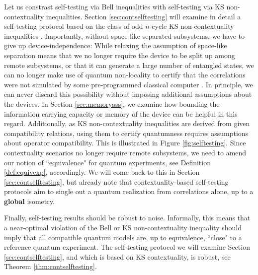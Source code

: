 Let us constrast self-testing via Bell inequalities with self-testing via KS non-contextuality inequalities. Section \ref{sec:contselftesting} will examine in detail a self-testing protocol based on the class of odd $n$-cycle KS non-contextuality inequalities \cite{Bharti2019}. Importantly, without space-like separated subsystems, we have to give up device-independence: While relaxing the assumption of space-like separation means that we no longer require the device to be split up among remote subsystems, or that it can generate a large number of entangled states, we can no longer make use of quantum non-locality to certify that the correlations were not simulated by some pre-programmed classical computer \cite{Supic2020}. In principle, we can never discard this possibility without imposing additional assumptions about the devices. In Section \ref{sec:memoryass}, we examine how bounding the information carrying capacity or memory of the device can be helpful in this regard. Additionally, as KS non-contextuality inequalities are derived from given compatibility relations, using them to certify quantumness requires assumptions about operator compatibility. This is illustrated in Figure \ref{fig:selftesting}. Since contextuality scenarios no longer require remote subsystems, we need to amend our notion of ``equivalence" for quantum experiments, see Definition \ref{def:equivexp}, accordingly. We will come back to this in Section \ref{sec:contselftesting}, but already note that contextuality-based self-testing protocols aim to single out a quantum realization from correlations alone, up to a \textbf{global} isometry.

Finally, self-testing results should be robust to noise. Informally, this means that a near-optimal violation of the Bell or KS non-contextuality inequality should imply that all compatible quantum models are, up to equivalence, ``close" to a reference quantum experiment. The self-testing protocol we will examine Section \ref{sec:contselftesting}, and which is based on KS contextuality, is robust, see Theorem \ref{thm:contselftesting}.


